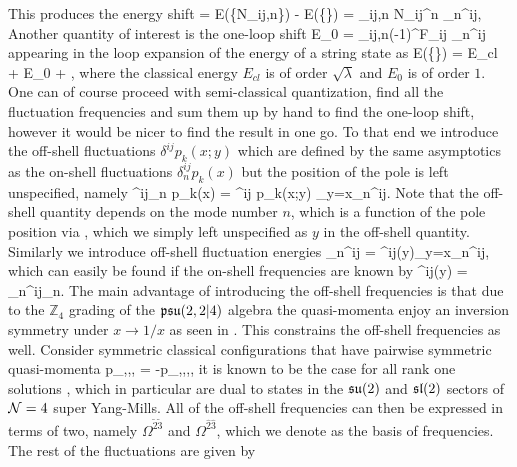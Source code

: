 This produces the energy shift
\beq
\delta \Delta = E(\{N_{ij,n}\}) - E(\{\}) = \sum_{ij,n} N_{ij}^n \Omega_n^{ij},
\eeq
Another quantity of interest is the one-loop shift
\beq
	\label{eq:one_loop_shift}
	E_0 =  \sum_{ij,n}(-1)^{F_{ij}} \Omega_n^{ij}
\eeq
appearing in the loop expansion of the energy of a string state as
\beq
	E(\{\}) = E_{cl} + E_0 + ,
\eeq
where the classical energy $E_{cl}$ is of order $\sqrt{\lambda}$ and $E_0$ is of order $1$.
One can of course proceed with semi-classical quantization, find all the fluctuation frequencies and sum them up by hand to find the one-loop shift, however it would be nicer to find the result in one go.
To that end we introduce the off-shell fluctuations $\delta^{ij} p_k(x;y)$ which are defined by the same asymptotics as the on-shell fluctuations $\delta^{ij}_n p_k(x)$ but the position of the pole is left unspecified, namely
\beq
	\delta^{ij}_n p_k(x) = \delta^{ij} p_k(x;y) \vert_{y=x_n^{ij}}.
\eeq
Note that the off-shell quantity depends on the mode number $n$, which is a function of the pole position via , which we simply left unspecified as $y$ in the off-shell quantity.
Similarly we introduce off-shell fluctuation energies
\beq
	\Omega_n^{ij} = \Omega^{ij}(y)\vert_{y=x_n^{ij}},
\eeq
which can easily be found if the on-shell frequencies are known by
\beq
	\label{eq:off_shell_freq}
	\Omega^{ij}(y) = \Omega_n^{ij}\vert_{n\rightarrow {}}.
\eeq
The main advantage of introducing the off-shell frequencies is that due to the $\mathbb{Z}_4$ grading of the $\mathfrak{psu}(2,2|4)$ algebra the quasi-momenta enjoy an inversion symmetry under $x \rightarrow 1/x$ as seen in .
This constrains the off-shell frequencies as well.
Consider symmetric classical configurations that have pairwise symmetric quasi-momenta
\beq
	p_{,,,} = -p_{,,,},
\eeq
it is known to be the case for all rank one solutions \cite{Gromov:2008ec}, which in particular are dual to states in the $\mathfrak{su}(2)$ and $\mathfrak{sl}(2)$ sectors of $\mathcal{N}=4$ super Yang-Mills. 
All of the off-shell frequencies can then be expressed in terms of two, namely $\Omega^{\tilde2 \tilde3}$ and $\Omega^{\hat2 \hat3}$, which we denote as the basis of frequencies.
The rest of the fluctuations are given by
\beq
